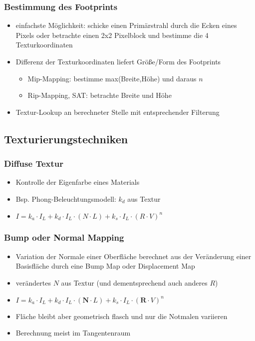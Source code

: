 \documentclass[paper=a4, fontsize=11pt]{scrartcl} %
\numberwithin{equation}{section} %
\numberwithin{figure}{section} %
\numberwithin{table}{section} %
\begin{document}
\subsubsection{Bestimmung des Footprints}

\begin{itemize}
\item einfachste Möglichkeit: schicke einen Primärstrahl durch die Ecken eines Pixels oder betrachte einen 2x2 Pixelblock und bestimme die 4 Texturkoordinaten
\item Differenz der Texturkoordinaten liefert Größe/Form des Footprints
\begin{itemize}
\item Mip-Mapping: bestimme max(Breite,Höhe) und daraus $n$
\item Rip-Mapping, SAT: betrachte Breite und Höhe
\end{itemize}
\item Textur-Lookup an berechneter Stelle mit entsprechender Filterung
\end{itemize}

\subsection{Texturierungstechniken}

\subsubsection{Diffuse Textur}

\begin{itemize}
\item Kontrolle der Eigenfarbe eines Materials
\item Bsp. Phong-Beleuchtungsmodell: $k_d$ aus Textur
\item $I = k_a \cdot I_L + k_d \cdot I_L \cdot (N \cdot L) + k_s \cdot I_L \cdot (R \cdot V)^n$
\end{itemize}

\subsubsection{Bump oder Normal Mapping}

\begin{itemize}
\item Variation der Normale einer Oberfläche berechnet aus der Veränderung einer Basisfläche durch eine Bump Map oder Displacement Map
\item verändertes $N$ aus Textur (und dementsprechend auch anderes $R$)
\item $I = k_a \cdot I_L + k_d \cdot I_L \cdot (\boldsymbol{N} \cdot L) + k_s \cdot I_L \cdot (\textbf{R} \cdot V)^n$
\item Fläche bleibt aber geometrisch flasch und nur die Notmalen variieren
\item Berechnung meist im Tangentenraum
\end{itemize}
\end{document}

